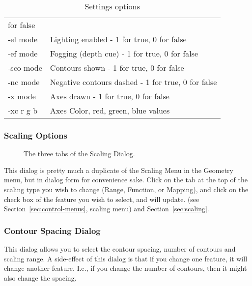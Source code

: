 \begin{table}[htbp]
\begin{center}
\begin{tabular}{|l|p{4in}|}
        for false \\ 
        -el mode        &       Lighting enabled - 1 for true, 0 for false \\
        -ef mode        &       Fogging (depth cue) - 1 for true, 0 for false \\
        -sco mode       &       Contours shown - 1 for true, 0 for false \\
        -nc mode        &       Negative contours dashed - 1 for true, 0
        for false \\ 
        -x mode         &       Axes drawn - 1 for true, 0 for false \\
        -xc r g b       &       Axes Color, red, green, blue values\\ \hline
\end{tabular}
\end{center}
\caption{\label{table:settingsoptions} Settings options}

\end{table}


\subsubsection{Scaling Options}
\label{sec:scalinggui}

\begin{figure}[htb]
  \begin{makeimage}
  \end{makeimage}
  \scaledialog
  \caption{\label{fig:scale1} The three tabs of the Scaling Dialog.}
\end{figure}

This dialog is pretty much a duplicate of the Scaling Menu in the Geometry
menu, but in dialog form for convenience sake.  Click on the tab at the top
of the scaling type you wish to change (Range, Function, or Mapping), and
click on the check box of the feature you wish to select, and \map{} will
update.  (see Section~\ref{sec:control-menus}, scaling menu) and 
Section~\ref{sec:scaling}.

\subsubsection{Contour Spacing Dialog}
\label{sec:contourwindow}

This dialog allows you to select the contour spacing, number of contours and 
scaling range.  A side-effect of this dialog is that if you change one feature,
it will change another feature.  I.e., if you change the number of contours,
then it might also change the spacing.

